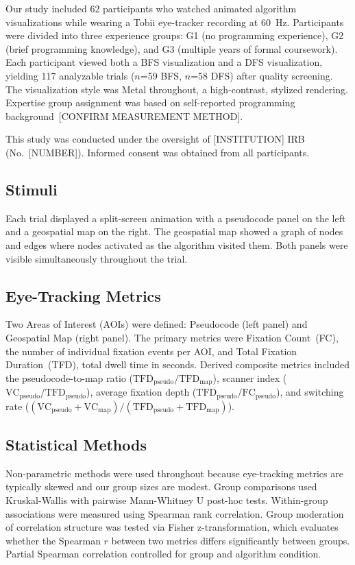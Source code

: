 \documentclass[journal]{vgtc}
\begin{document}
Our study included 62 participants who watched animated algorithm
visualizations while wearing a Tobii eye-tracker recording at 60~Hz.
Participants were divided into three experience groups: G1 (no programming
experience), G2 (brief programming knowledge), and G3 (multiple years of
formal coursework). Each participant viewed both a BFS visualization and a
DFS visualization, yielding 117 analyzable trials ($n$=59 BFS, $n$=58 DFS)
after quality screening. The visualization style was Metal throughout, a
high-contrast, stylized rendering. Expertise group assignment was based on
self-reported programming background~[CONFIRM MEASUREMENT METHOD].

This study was conducted under the oversight of [INSTITUTION] IRB
(No.~[NUMBER]). Informed consent was obtained from all participants.

\subsection{Stimuli}

Each trial displayed a split-screen animation with a pseudocode panel on the
left and a geospatial map on the right. The geospatial map showed a graph of
nodes and edges where nodes activated as the algorithm visited them. Both
panels were visible simultaneously throughout the trial.

\subsection{Eye-Tracking Metrics}

Two Areas of Interest (AOIs) were defined: Pseudocode (left panel) and
Geospatial Map (right panel). The primary metrics were Fixation Count~(FC),
the number of individual fixation events per AOI, and Total Fixation
Duration~(TFD), total dwell time in seconds. Derived composite metrics
included the pseudocode-to-map ratio ($\text{TFD}_\text{pseudo} /
\text{TFD}_\text{map}$), scanner index ($\text{VC}_\text{pseudo} /
\text{TFD}_\text{pseudo}$), average fixation depth ($\text{TFD}_\text{pseudo}
/ \text{FC}_\text{pseudo}$), and switching rate
($(\text{VC}_\text{pseudo} + \text{VC}_\text{map}) /
(\text{TFD}_\text{pseudo} + \text{TFD}_\text{map})$).

\subsection{Statistical Methods}

Non-parametric methods were used throughout because eye-tracking metrics are
typically skewed and our group sizes are modest. Group comparisons used
Kruskal-Wallis with pairwise Mann-Whitney U post-hoc tests. Within-group
associations were measured using Spearman rank correlation. Group moderation
of correlation structure was tested via Fisher z-transformation, which
evaluates whether the Spearman $r$ between two metrics differs significantly
between groups. Partial Spearman correlation controlled for group and
algorithm condition.
\end{document}
